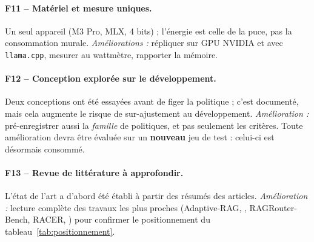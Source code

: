 \documentclass[11pt,a4paper]{article}
\begin{document}
\paragraph{F11 -- Matériel et mesure uniques.} Un seul appareil (M3 Pro, MLX, 4 bits) ; l'énergie est
celle de la puce, pas la consommation murale. \emph{Améliorations :} répliquer sur GPU NVIDIA et avec
\texttt{llama.cpp}, mesurer au wattmètre, rapporter la mémoire.

\paragraph{F12 -- Conception explorée sur le développement.} Deux conceptions ont été essayées avant de
figer la politique ; c'est documenté, mais cela augmente le risque de sur-ajustement au développement.
\emph{Amélioration :} pré-enregistrer aussi la \emph{famille} de politiques, et pas seulement les
critères. Toute amélioration devra être évaluée sur un \textbf{nouveau} jeu de test : celui-ci est
désormais consommé.

\paragraph{F13 -- Revue de littérature à approfondir.} L'état de l'art a d'abord été établi à partir
des résumés des articles. \emph{Amélioration :} lecture complète des travaux les plus proches
(Adaptive-RAG, \citealp{moskvoretskii2025adaptive}, RAGRouter-Bench, RACER, \citealp{li2026beyond})
pour confirmer le positionnement du tableau~\ref{tab:positionnement}.
\end{document}
